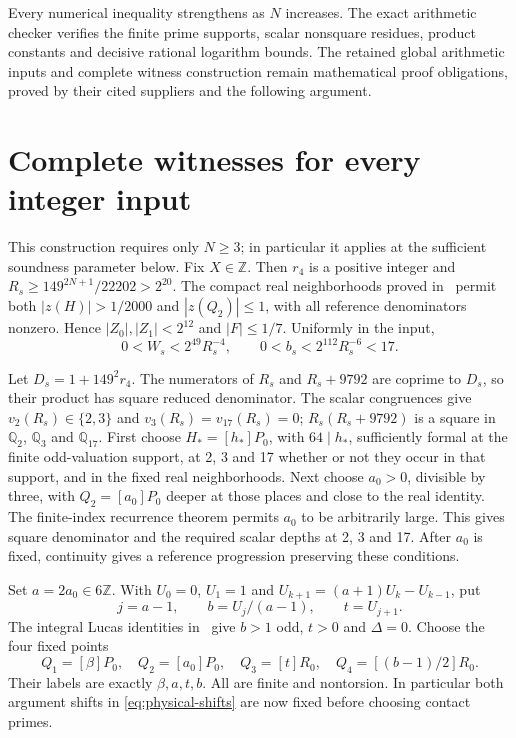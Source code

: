 \documentclass[11pt,a4paper]{article}
\newcommand{\Q}{\mathbb Q}\newcommand{\Z}{\mathbb Z}
\begin{document}
Every numerical inequality strengthens as $N$ increases.
The exact arithmetic checker verifies the finite prime supports,
scalar nonsquare residues, product constants and decisive rational
logarithm bounds. The retained global arithmetic inputs and complete
witness construction remain mathematical proof obligations, proved
by their cited suppliers and the following argument.

\section{Complete witnesses for every integer input}

This construction requires only $N\ge3$; in particular it applies
at the sufficient soundness parameter below. Fix $X\in\Z$.
Then $r_4$ is a positive integer and
$R_s\ge149^{2N+1}/22202>2^{20}$.
The compact real neighborhoods proved in~\cite{ExplicitParent}
permit both $|z(H)|>1/2000$ and $|z(Q_2)|\le1$, with all reference
denominators nonzero. Hence $|Z_0|,|Z_1|<2^{12}$ and $|F|\le1/7$.
Uniformly in the input,
\[
              0<W_s<2^{49}R_s^{-4},\qquad
              0<b_s<2^{112}R_s^{-6}<17.
\]

Let $D_s=1+149^2r_4$. The numerators of $R_s$ and
$R_s+9792$ are coprime to $D_s$, so their product has square
reduced denominator. The scalar congruences give
$v_2(R_s)\in\{2,3\}$ and $v_3(R_s)=v_{17}(R_s)=0$;
$R_s(R_s+9792)$ is a square in $\Q_2$, $\Q_3$ and $\Q_{17}$.
First choose $H_*=[h_*]P_0$, with $64\mid h_*$, sufficiently
formal at the finite odd-valuation support, at 2, 3 and 17 whether
or not they occur in that support, and in the fixed real
neighborhoods. Next choose $a_0>0$, divisible by three, with
$Q_2=[a_0]P_0$ deeper at those places and close to the real identity.
The finite-index recurrence theorem permits $a_0$ to be arbitrarily
large. This gives square denominator and the required scalar
depths at 2, 3 and 17. After $a_0$ is fixed, continuity gives a
reference progression preserving these conditions.

Set $a=2a_0\in6\Z$. With $U_0=0$, $U_1=1$ and
$U_{k+1}=(a+1)U_k-U_{k-1}$, put
\[
       j=a-1,\qquad b=U_j/(a-1),\qquad t=U_{j+1}.
\]
The integral Lucas identities in~\cite{ExplicitParent} give
$b>1$ odd, $t>0$ and $\Delta=0$. Choose the four fixed points
\[
 Q_1=[\beta]P_0,\quad Q_2=[a_0]P_0,\quad
 Q_3=[t]R_0,\quad Q_4=[(b-1)/2]R_0.
\]
Their labels are exactly $\beta,a,t,b$. All are finite and
nontorsion. In particular both argument shifts in
\eqref{eq:physical-shifts} are now fixed before choosing contact
primes.
\end{document}
